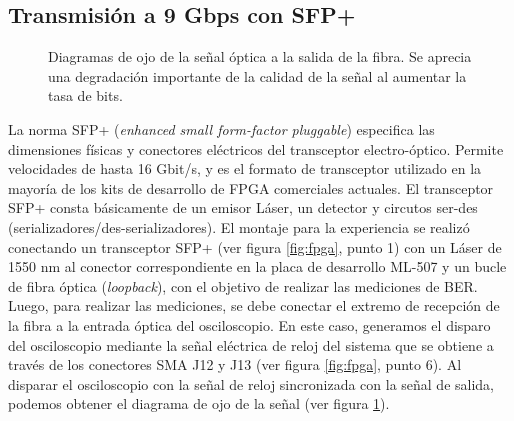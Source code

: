 
\subsection{Transmisión a 9 Gbps con SFP+}

\begin{figure}[!t]
   \centering
   \qquad
   \qquad
  \caption {Diagramas de ojo de la señal óptica a la salida de la fibra. Se aprecia una degradación importante de la calidad de la señal al aumentar la tasa de bits.}
  \label{fig:ImgOjo}
\end{figure}


La norma SFP+ \cite{sff4sff} (\textit{enhanced small form-factor pluggable}) especifica las dimensiones físicas y conectores eléctricos del transceptor electro-óptico. Permite velocidades de hasta 16 Gbit/s, y es el formato de transceptor utilizado en la mayoría de los kits de desarrollo de FPGA comerciales actuales.
El transceptor SFP+ consta básicamente de un emisor Láser, un detector y circutos ser-des (serializadores/des-serializadores).
El montaje para la experiencia se realizó conectando un transceptor SFP+ (ver figura \ref{fig:fpga}, punto 1) con un Láser de 1550 nm 
al conector correspondiente en la placa de desarrollo ML-507 y un bucle de
fibra óptica ({\em loopback}), con el objetivo de realizar las
mediciones de BER. Luego, para realizar las mediciones, se debe conectar el extremo de recepción de la fibra a la entrada óptica del osciloscopio. En este caso, generamos el disparo del
osciloscopio mediante la señal eléctrica de reloj del sistema que
se obtiene a través de los conectores SMA J12 y J13 (ver figura \ref{fig:fpga}, punto 6).  
Al disparar el osciloscopio con la señal de reloj sincronizada con la señal de salida, podemos obtener el diagrama de ojo de la señal (ver figura \ref{fig:ImgOjo}).

